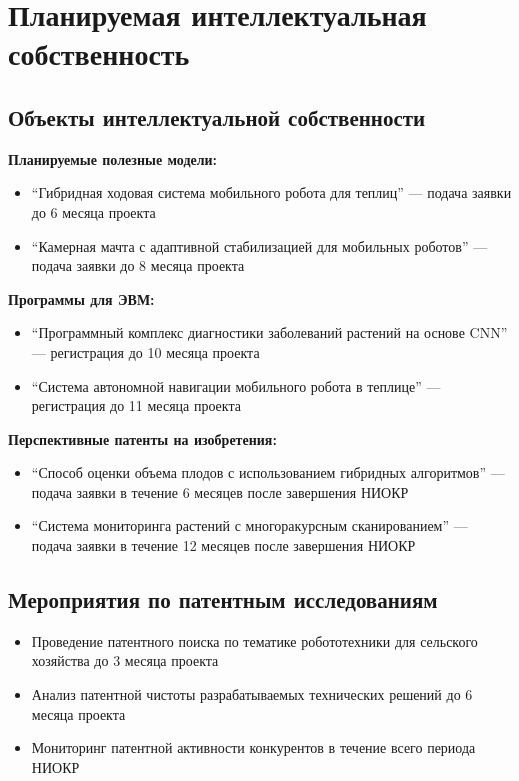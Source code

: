 \documentclass[12pt,a4paper]{article}
\begin{document}
\section{Планируемая интеллектуальная собственность}

\subsection{Объекты интеллектуальной собственности}

\textbf{Планируемые полезные модели:}
\begin{itemize}
    \item ``Гибридная ходовая система мобильного робота для теплиц'' — подача заявки до 6 месяца проекта
    \item ``Камерная мачта с адаптивной стабилизацией для мобильных роботов'' — подача заявки до 8 месяца проекта
\end{itemize}

\textbf{Программы для ЭВМ:}
\begin{itemize}
    \item ``Программный комплекс диагностики заболеваний растений на основе CNN'' — регистрация до 10 месяца проекта
    \item ``Система автономной навигации мобильного робота в теплице'' — регистрация до 11 месяца проекта
\end{itemize}

\textbf{Перспективные патенты на изобретения:}
\begin{itemize}
    \item ``Способ оценки объема плодов с использованием гибридных алгоритмов'' — подача заявки в течение 6 месяцев после завершения НИОКР
    \item ``Система мониторинга растений с многоракурсным сканированием'' — подача заявки в течение 12 месяцев после завершения НИОКР
\end{itemize}

\subsection{Мероприятия по патентным исследованиям}
\begin{itemize}
    \item Проведение патентного поиска по тематике робототехники для сельского хозяйства до 3 месяца проекта
    \item Анализ патентной чистоты разрабатываемых технических решений до 6 месяца проекта
    \item Мониторинг патентной активности конкурентов в течение всего периода НИОКР
\end{itemize}
\end{document}
